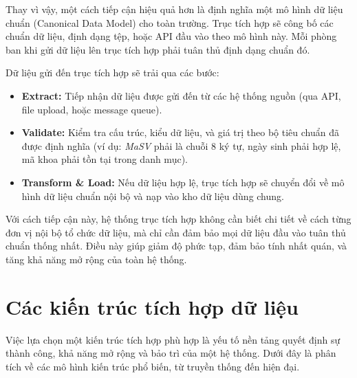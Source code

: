 Thay vì vậy, một cách tiếp cận hiệu quả hơn là định nghĩa một mô hình dữ liệu chuẩn (Canonical Data Model) cho toàn trường. Trục tích hợp sẽ công bố các chuẩn dữ liệu, định dạng tệp, hoặc API đầu vào theo mô hình này. Mỗi phòng ban khi gửi dữ liệu lên trục tích hợp phải tuân thủ định dạng chuẩn đó. 

Dữ liệu gửi đến trục tích hợp sẽ trải qua các bước:
\begin{itemize}
    \item \textbf{Extract:} Tiếp nhận dữ liệu được gửi đến từ các hệ thống nguồn (qua API, file upload, hoặc message queue).
    \item \textbf{Validate:} Kiểm tra cấu trúc, kiểu dữ liệu, và giá trị theo bộ tiêu chuẩn đã được định nghĩa (ví dụ: \textit{MaSV} phải là chuỗi 8 ký tự, ngày sinh phải hợp lệ, mã khoa phải tồn tại trong danh mục).
    \item \textbf{Transform \& Load:} Nếu dữ liệu hợp lệ, trục tích hợp sẽ chuyển đổi về mô hình dữ liệu chuẩn nội bộ và nạp vào kho dữ liệu dùng chung.
\end{itemize}

Với cách tiếp cận này, hệ thống trục tích hợp không cần biết chi tiết về cách từng đơn vị nội bộ tổ chức dữ liệu, mà chỉ cần đảm bảo mọi dữ liệu đầu vào tuân thủ chuẩn thống nhất. Điều này giúp giảm độ phức tạp, đảm bảo tính nhất quán, và tăng khả năng mở rộng của toàn hệ thống.

\section{Các kiến trúc tích hợp dữ liệu}
Việc lựa chọn một kiến trúc tích hợp phù hợp là yếu tố nền tảng quyết định sự thành công, khả năng mở rộng và bảo trì của một hệ thống. Dưới đây là phân tích về các mô hình kiến trúc phổ biến, từ truyền thống đến hiện đại.

